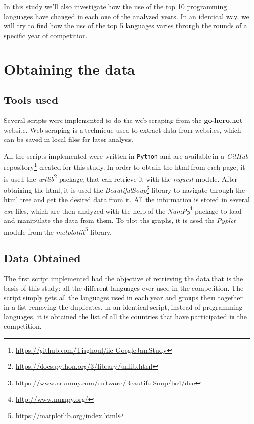 \documentclass{article}
\begin{document}
\begin{multicols*}{2}
In this study we'll also investigate how the use of the top 10 programming languages have changed in each one of the analyzed years. In an identical way, we will try to find how the use of the top 5 languages varies through the rounds of a specific year of competition.




\section{Obtaining the data}

\subsection{Tools used}

Several scripts were implemented to do the web scraping from the \textbf{go-hero.net} website. Web scraping is a technique used to extract data from websites\cite{web_sc}, which can be saved in local files for later analysis.

All the scripts implemented were written in \texttt{Python} and are available in a \textit{GitHub} repository\footnote{\url{https://github.com/Tiaghoul/iic-GoogleJamStudy}} created for this study. In order to obtain the html from each page, it is used the \textit{urllib}\footnote{\url{https://docs.python.org/3/library/urllib.html}} package, that can retrieve it with the \textit{request} module. After obtaining the html, it is used the \textit{BeautifulSoup}\footnote{\url{https://www.crummy.com/software/BeautifulSoup/bs4/doc}} library to navigate through the html tree and get the desired data from it. All the information is stored in several \textit{csv} files, which are then analyzed with the help of the \textit{NumPy}\footnote{\url{http://www.numpy.org/}} package to load and manipulate the data from them. To plot the graphs, it is used the \textit{Pyplot} module from the \textit{matplotlib}\footnote{\url{https://matplotlib.org/index.html}} library.


\subsection{Data Obtained}

The first script implemented had the objective of retrieving the data that is the basis of this study: all the different languages ever used in the competition. The script simply gets all the languages used in each year and groups them together in a list removing the duplicates. In an identical script, instead of programming languages, it is obtained the list of all the countries that have participated in the competition.


\end{multicols*}
\end{document}
